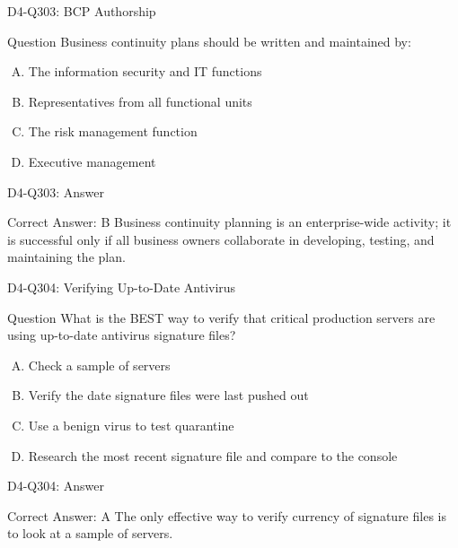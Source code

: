 \documentclass{beamer}
\begin{document}
	\begin{frame}{D4-Q303: BCP Authorship}
		\begin{block}{Question}
			Business continuity plans should be written and maintained by:
		\end{block}
		\begin{enumerate}[(A)]
			\item The information security and IT functions
			\item Representatives from all functional units
			\item The risk management function
			\item Executive management
		\end{enumerate}
	\end{frame}
	\begin{frame}{D4-Q303: Answer}
		\begin{block}{Correct Answer: B}
			Business continuity planning is an enterprise-wide activity; it is successful only if all business owners collaborate in developing, testing, and maintaining the plan.
		\end{block}
	\end{frame}
	
	\begin{frame}{D4-Q304: Verifying Up-to-Date Antivirus}
		\begin{block}{Question}
			What is the BEST way to verify that critical production servers are using up-to-date antivirus signature files?
		\end{block}
		\begin{enumerate}[(A)]
			\item Check a sample of servers
			\item Verify the date signature files were last pushed out
			\item Use a benign virus to test quarantine
			\item Research the most recent signature file and compare to the console
		\end{enumerate}
	\end{frame}
	\begin{frame}{D4-Q304: Answer}
		\begin{block}{Correct Answer: A}
			The only effective way to verify currency of signature files is to look at a sample of servers.
		\end{block}
	\end{frame}
	
\end{document}
